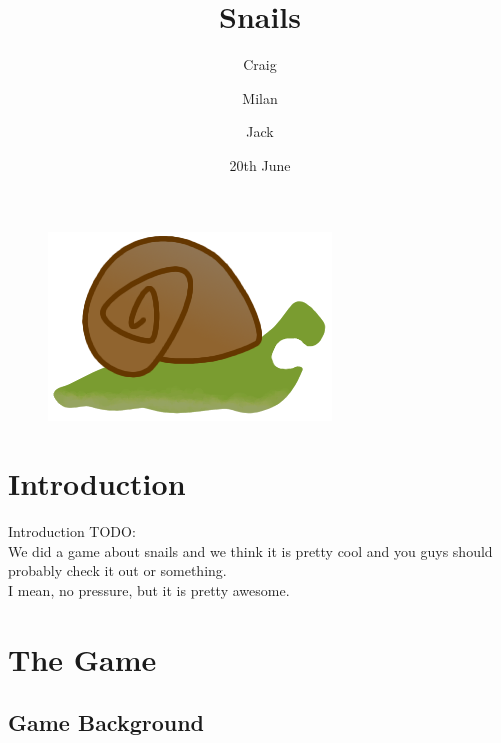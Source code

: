 \documentclass{beamer}
\title{Snails}
\author{Craig \and Milan \and Jack}
\date{20th June}
\begin{document}
\begin{frame}
  \titlepage
  \vspace{\baselineskip}
  \begin{figure}
    \includegraphics[scale=0.15]{snail_teeth.png}
  \end{figure}
\end{frame}

\section{Introduction}

\begin{frame}{Introduction}
  TODO:\\
  \vspace{\baselineskip}
  We did a game about snails and we think it is pretty cool and you guys should probably check it out or something. \\
  \vspace{\baselineskip}
  I mean, no pressure, but it is pretty awesome.
\end{frame}


\section{The Game}
\subsection{Game Background}
\end{document}
